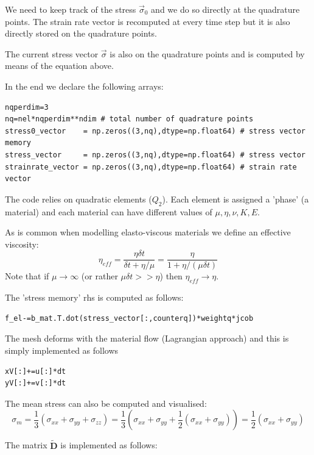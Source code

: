 We need to keep track of the stress $\vec{\sigma}_0$ and 
we do so directly at the quadrature points.
The strain rate vector is recomputed at every time step but it is also 
directly stored on the quadrature points.

The current stress vector $\vec{\sigma}$ is also on the quadrature points and
is computed by means of the equation above.

In the end we declare the following arrays:
\begin{lstlisting}
nqperdim=3
nq=nel*nqperdim**ndim # total number of quadrature points
stress0_vector    = np.zeros((3,nq),dtype=np.float64) # stress vector memory
stress_vector     = np.zeros((3,nq),dtype=np.float64) # stress vector 
strainrate_vector = np.zeros((3,nq),dtype=np.float64) # strain rate vector
\end{lstlisting}

The code relies on quadratic elements ($Q_2$).
Each element is assigned a 'phase' (a material) and 
each material can have different values of $\mu, \eta, \nu, K, E$.

As is common when modelling elasto-viscous materials
we define an effective viscosity:
\[
\eta_{eff} 
= \frac{\eta \delta t}{\delta t + \eta/\mu} 
= \frac{\eta }{1 + \eta/(\mu \delta t)} 
\]
Note that if $\mu\rightarrow \infty$ (or rather $\mu \delta t >> \eta$) 
then $\eta_{eff} \rightarrow \eta$. 





The 'stress memory' rhs is computed as follows:
\begin{lstlisting}
f_el-=b_mat.T.dot(stress_vector[:,counterq])*weightq*jcob
\end{lstlisting}



The mesh deforms with the material flow (Lagrangian approach)
and this is simply implemented as follows 

\begin{lstlisting}
xV[:]+=u[:]*dt
yV[:]+=v[:]*dt
\end{lstlisting}

The mean stress can also be computed and visualised:
\[
\sigma_m 
= \frac{1}{3}(\sigma_{xx}+\sigma_{yy}+\sigma_{zz})
= \frac{1}{3}(\sigma_{xx}+\sigma_{yy}+\frac12(\sigma_{xx}+\sigma_{yy}))
= \frac{1}{2}(\sigma_{xx}+\sigma_{yy})
\]

The matrix $\tilde{\bm D}$ is implemented as follows:


